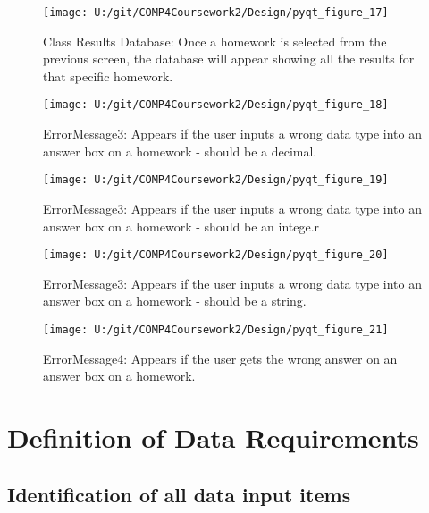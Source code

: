 \begin{figure}[H]
    \label{fig:print_function_result}\caption{Class Results Database: Once a homework is selected from the previous screen, the database will appear showing all the results for that specific homework.}
    \texttt{[image: U:/git/COMP4Coursework2/Design/pyqt\_figure\_17]}
\end{figure}

\begin{figure}[H]
    \label{fig:print_function_result}\caption{ErrorMessage3: Appears if the user inputs a wrong data type into an answer box on a homework - should be a decimal.}
    \texttt{[image: U:/git/COMP4Coursework2/Design/pyqt\_figure\_18]}
\end{figure}

\begin{figure}[H]
    \label{fig:print_function_result}\caption{ErrorMessage3: Appears if the user inputs a wrong data type into an answer box on a homework - should be an intege.r}
    \texttt{[image: U:/git/COMP4Coursework2/Design/pyqt\_figure\_19]}
\end{figure}

\begin{figure}[H]
    \label{fig:print_function_result}\caption{ErrorMessage3: Appears if the user inputs a wrong data type into an answer box on a homework - should be a string.}
    \texttt{[image: U:/git/COMP4Coursework2/Design/pyqt\_figure\_20]}
\end{figure}

\begin{figure}[H]
    \label{fig:print_function_result}\caption{ErrorMessage4: Appears if the user gets the wrong answer on an answer box on a homework.}
    \texttt{[image: U:/git/COMP4Coursework2/Design/pyqt\_figure\_21]}
\end{figure}

\section{Definition of Data Requirements}

\subsection{Identification of all data input items}

